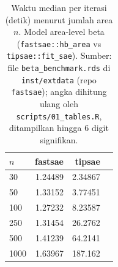 \begin{table}[htbp]
\centering
\caption{Waktu median per iterasi (detik) menurut jumlah area $n$. Model area-level beta (\texttt{fastsae::hb\_area} vs \texttt{tipsae::fit\_sae}). Sumber: file \texttt{beta\_benchmark.rds} di \texttt{inst/extdata} (repo \texttt{fastsae}); angka dihitung ulang oleh \texttt{scripts/01\_tables.R}, ditampilkan hingga 6 digit signifikan.}
\label{tab:time-beta}
\small
\begin{tabular}{lrrr}
\toprule
$n$ & fastsae & tipsae \\
\midrule
30 & 1.24489 & 2.34867 \\
50 & 1.33152 & 3.77451 \\
100 & 1.27232 & 8.23587 \\
250 & 1.31454 & 26.2762 \\
500 & 1.41239 & 64.2141 \\
1000 & 1.63967 & 187.162 \\
\bottomrule
\end{tabular}
\end{table}

